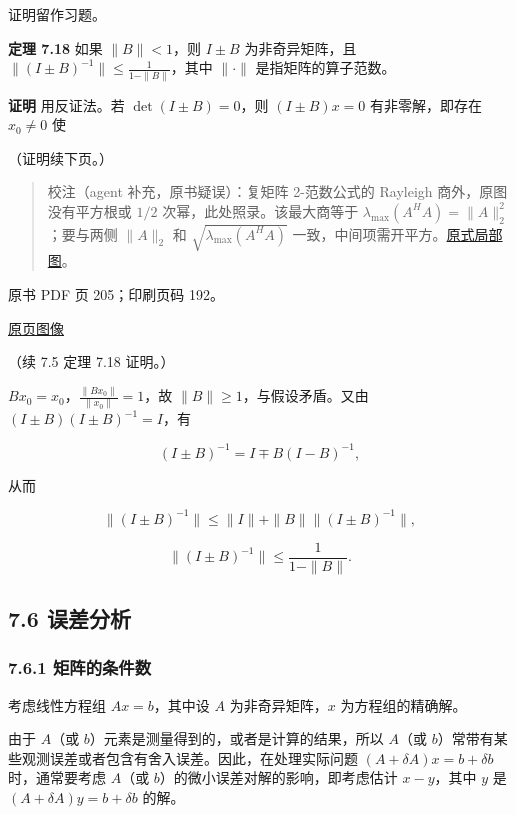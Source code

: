 证明留作习题。

\textbf{定理 7.18} 如果 \(\|B\|<1\)，则 \(I\pm B\) 为非奇异矩阵，且 \(\|(I\pm B)^{-1}\|\leqslant\frac1{1-\|B\|}\)，其中 \(\|\cdot\|\) 是指矩阵的算子范数。

\textbf{证明} 用反证法。若 \(\det(I\pm B)=0\)，则 \((I\pm B)x=0\) 有非零解，即存在 \(x_0\neq0\) 使

（证明续下页。）

\begin{quote}
校注（agent 补充，原书疑误）：复矩阵 2-范数公式的 Rayleigh 商外，原图没有平方根或 \(1/2\) 次幂，此处照录。该最大商等于 \(\lambda_{\max}(A^HA)=\|A\|_2^2\)；要与两侧 \(\|A\|_2\) 和 \(\sqrt{\lambda_{\max}(A^HA)}\) 一致，中间项需开平方。\href{verified/assets/ch07b/204-complex-norm.png}{原式局部图}。
\end{quote}

\clearpage

原书 PDF 页 205；印刷页码 192。

\href{source-images/pdf-205.jpeg}{原页图像}

（续 7.5 定理 7.18 证明。）

\(Bx_0=x_0\)，\(\frac{\|Bx_0\|}{\|x_0\|}=1\)，故 \(\|B\|\geqslant1\)，与假设矛盾。又由 \((I\pm B)(I\pm B)^{-1}=I\)，有

\[
(I\pm B)^{-1}=I\mp B(I-B)^{-1},
\]

从而

\[
\|(I\pm B)^{-1}\|\leqslant\|I\|+\|B\|\|(I\pm B)^{-1}\|,
\]

\[
\|(I\pm B)^{-1}\|\leqslant\frac1{1-\|B\|}.
\]

\subsection{7.6 误差分析}\label{ch07b-ux8befux5deeux5206ux6790}

\subsubsection{7.6.1 矩阵的条件数}\label{ch07b-ux77e9ux9635ux7684ux6761ux4ef6ux6570}

考虑线性方程组 \(Ax=b\)，其中设 \(A\) 为非奇异矩阵，\(x\) 为方程组的精确解。

由于 \(A\)（或 \(b\)）元素是测量得到的，或者是计算的结果，所以 \(A\)（或 \(b\)）常带有某些观测误差或者包含有舍入误差。因此，在处理实际问题 \((A+\delta A)x=b+\delta b\) 时，通常要考虑 \(A\)（或 \(b\)）的微小误差对解的影响，即考虑估计 \(x-y\)，其中 \(y\) 是 \((A+\delta A)y=b+\delta b\) 的解。

